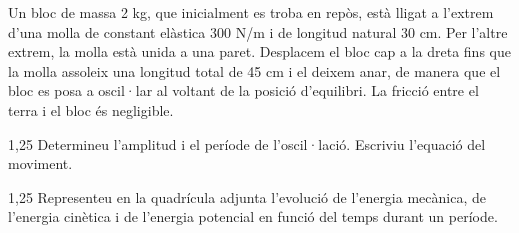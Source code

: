 Un bloc de massa 2 kg, que inicialment es troba en repòs, està lligat a l'extrem d'una
molla de constant elàstica 300 N/m i de longitud natural 30 cm. Per l'altre extrem, la
molla està unida a una paret. Desplacem el bloc cap a la dreta fins que la molla assoleix
una longitud total de 45 cm i el deixem anar, de manera que el bloc es posa a oscil·lar al
voltant de la posició d'equilibri. La fricció entre el terra i el bloc és negligible.


\begin{apartat}{1,25}
Determineu l'amplitud i el període de l'oscil·lació. Escriviu l'equació del moviment.
\end{apartat}

\begin{apartat}{1,25}
Representeu en la quadrícula adjunta l'evolució de l'energia mecànica, de l'energia
cinètica i de l'energia potencial en funció del temps durant un període.
\end{apartat}
